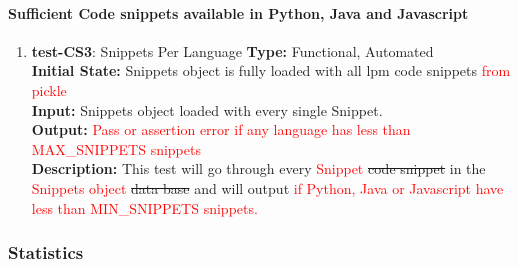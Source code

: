 \documentclass[12pt, titlepage]{article}
\begin{document}
\paragraph{Sufficient Code snippets available in Python, Java and Javascript}
\begin{enumerate}

\item{\textbf{test-CS3}: Snippets Per Language}
\textbf{Type:} Functional, Automated \\
\textbf{Initial State:} Snippets object is fully loaded with all lpm code snippets \textcolor{red}{from pickle}\\
\textbf{Input:} Snippets object loaded with every single Snippet. \\
\textbf{Output:} \textcolor{red}{Pass or assertion error if any language has less than MAX\_SNIPPETS snippets}\\
\textbf{Description:} This test will go through every \textcolor{red}{Snippet} \sout{code snippet} in the \textcolor{red}{Snippets object} \sout{data base} and will output \textcolor{red}{if Python, Java or Javascript have less than  MIN\_SNIPPETS snippets.}\\

\end{enumerate}

\subsubsection{Statistics}
\end{document}
